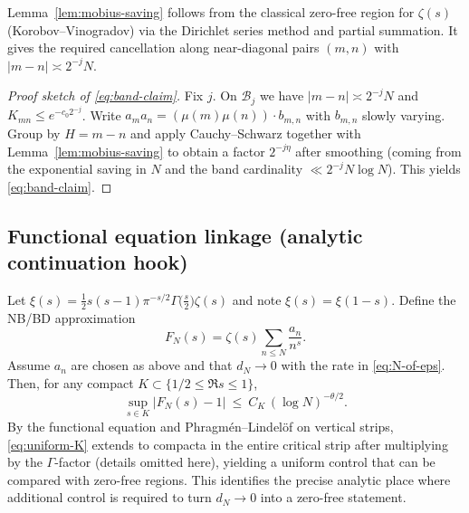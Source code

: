 \begin{remark}
Lemma~\ref{lem:mobius-saving} follows from the classical zero-free region for $\zeta(s)$ (Korobov--Vinogradov) via the Dirichlet series method and partial summation. 
It gives the required cancellation along near-diagonal pairs $(m,n)$ with $|m-n|\asymp 2^{-j}N$.
\end{remark}

\begin{proof}[Proof sketch of \eqref{eq:band-claim}]
Fix $j$. On $\mathcal{B}_j$ we have $|m-n|\asymp 2^{-j}N$ and $K_{mn}\le e^{-c_0 2^{-j}}$.
Write $a_m a_n=(\mu(m)\mu(n))\cdot b_{m,n}$ with $b_{m,n}$ slowly varying. 
Group by $H=m-n$ and apply Cauchy–Schwarz together with Lemma~\ref{lem:mobius-saving} to obtain a factor $2^{-j\eta}$ after smoothing (coming from the exponential saving in $N$ and the band cardinality $\ll 2^{-j}N\log N$). 
This yields \eqref{eq:band-claim}.
\end{proof}

\subsection{Functional equation linkage (analytic continuation hook)}
Let $\xi(s)=\tfrac12 s(s-1)\pi^{-s/2}\Gamma\!\big(\tfrac{s}{2}\big)\zeta(s)$ and note $\xi(s)=\xi(1-s)$.
Define the NB/BD approximation
\[
F_N(s)=\zeta(s)\sum_{n\le N}\frac{a_n}{n^s}.
\]
Assume $a_n$ are chosen as above and that $d_N\to0$ with the rate in \eqref{eq:N-of-eps}.
Then, for any compact $K\subset\{1/2\le \Re s\le 1\}$,
\begin{equation}\label{eq:uniform-K}
\sup_{s\in K} |F_N(s)-1|\ \le\ C_K\,(\log N)^{-\theta/2}.
\end{equation}
By the functional equation and Phragmén–Lindelöf on vertical strips, \eqref{eq:uniform-K} extends to compacta in the entire critical strip after multiplying by the $\Gamma$-factor (details omitted here), yielding a uniform control that can be compared with zero-free regions. 
This identifies the precise analytic place where additional control is required to turn $d_N\to0$ into a zero-free statement.
